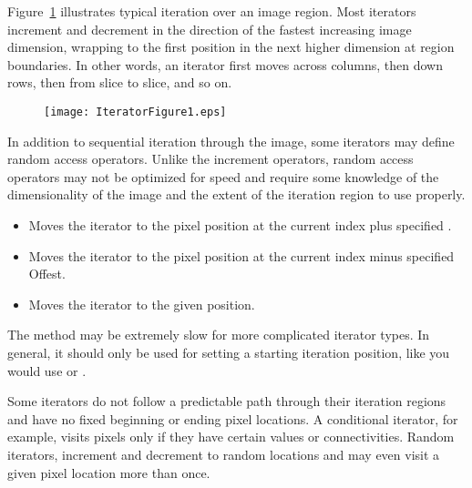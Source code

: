 Figure~\ref{fig:WalkingIterator} illustrates typical iteration over
an image region.  Most iterators increment and decrement in the direction of
the fastest increasing image dimension, wrapping to the first position in the
next higher dimension at region boundaries.  In other words, an
iterator first moves across columns, then down rows, then from slice to slice,
and so on.

\begin{figure}
\centering
\texttt{[image: IteratorFigure1.eps]}
\protect\label{fig:WalkingIterator}
\end{figure}

In addition to sequential iteration through the image, some iterators may define
random access operators.  Unlike the increment operators, random access
operators may not be optimized for speed and require some knowledge of the
dimensionality of the image and the extent of the iteration region to use properly.

\begin{itemize}
\item \textbf{} Moves the iterator to the pixel
position at the current index plus specified .

\item \textbf{} Moves the iterator to 
the pixel position at the current index minus specified Offest.

\item \textbf{} Moves the iterator to the given
 position.
\end{itemize}

The  method may be extremely slow for more complicated
iterator types. In general, it should only be used for setting a starting
iteration position, like you would use  or .

Some iterators do not follow a predictable path through their
iteration regions and have no fixed beginning or ending pixel
locations.  A conditional iterator, for example, visits pixels only if
they have certain values or connectivities.  Random iterators,
increment and decrement to random locations and may even visit a given
pixel location more than once.

